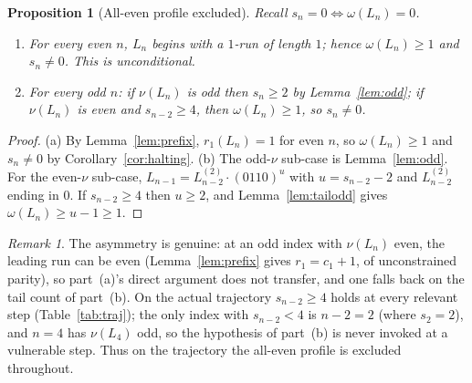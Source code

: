 \documentclass[11pt,reqno]{amsart}
\theoremstyle{plain}
\newtheorem{proposition}{Proposition}
\theoremstyle{definition}
\theoremstyle{remark}
\newtheorem{remark}{Remark}
\begin{document}
\begin{proposition}[All-even profile excluded]\label{prop:alleven}
Recall $s_n=0\iff\omega(L_n)=0$.
\begin{enumerate}[label=(\alph*)]
\item For every even $n$, $L_n$ begins with a $1$-run of length $1$; hence $\omega(L_n)\ge 1$ and $s_n\ne 0$. This is unconditional.
\item For every odd $n$: if $\nu(L_n)$ is odd then $s_n\ge 2$ by Lemma~\ref{lem:odd}; if $\nu(L_n)$ is even and $s_{n-2}\ge 4$, then $\omega(L_n)\ge 1$, so $s_n\ne 0$.
\end{enumerate}
\end{proposition}
\begin{proof}
(a) By Lemma~\ref{lem:prefix}, $r_1(L_n)=1$ for even $n$, so $\omega(L_n)\ge 1$ and $s_n\ne 0$ by Corollary~\ref{cor:halting}. (b) The odd-$\nu$ sub-case is Lemma~\ref{lem:odd}. For the even-$\nu$ sub-case, $L_{n-1}=L^{(2)}_{n-2}\cdot(0110)^u$ with $u=s_{n-2}-2$ and $L^{(2)}_{n-2}$ ending in $0$. If $s_{n-2}\ge 4$ then $u\ge 2$, and Lemma~\ref{lem:tailodd} gives $\omega(L_n)\ge u-1\ge 1$.
\end{proof}

\begin{remark}\label{rem:rem17}
The asymmetry is genuine: at an odd index with $\nu(L_n)$ even, the leading run can be even (Lemma~\ref{lem:prefix} gives $r_1=c_1+1$, of unconstrained parity), so part~(a)'s direct argument does not transfer, and one falls back on the tail count of part~(b). On the actual trajectory $s_{n-2}\ge 4$ holds at every relevant step (Table~\ref{tab:traj}); the only index with $s_{n-2}<4$ is $n-2=2$ (where $s_2=2$), and $n=4$ has $\nu(L_4)$ odd, so the hypothesis of part~(b) is never invoked at a vulnerable step. Thus on the trajectory the all-even profile is excluded throughout.
\end{remark}
\end{document}
